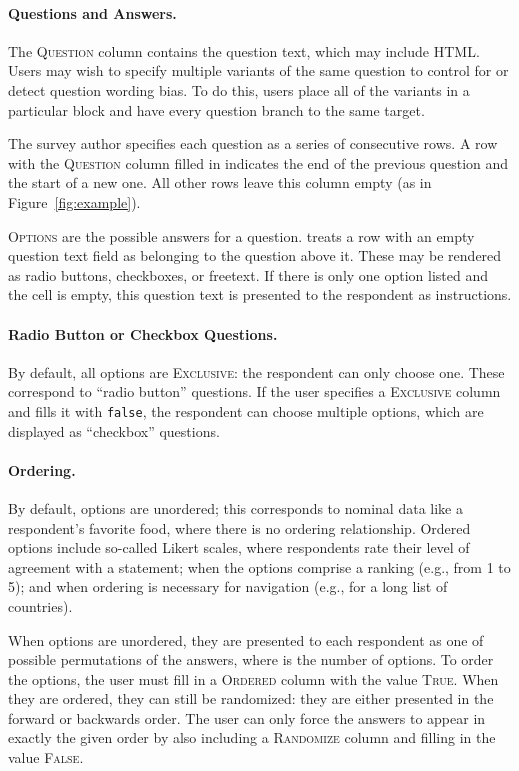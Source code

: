 \paragraph{Questions and Answers.}
The \textsc{Question} column contains the question text, which may
include HTML. Users may wish to specify multiple variants of the same question
to control for or detect question wording bias. To do this, users place
all of the variants in a particular block and have every question branch
to the same target.

The survey author specifies each question as a series of consecutive
rows. A row with the \textsc{Question} column filled in indicates the
end of the previous question and the start of a new one. All other
rows leave this column empty (as in Figure~\ref{fig:example}).

\textsc{Options} are the possible answers for a question. \surveyman{}
treats a row with an empty question text field as belonging to the
question above it. These may be rendered as radio buttons, checkboxes,
or freetext. If there is only one option listed and the cell is empty,
this question text is presented to the respondent as instructions.

\paragraph{Radio Button or Checkbox Questions.}
By default, all options are \textsc{Exclusive}: the respondent can
only choose one. These correspond to ``radio button'' questions. If
the user specifies a \textsc{Exclusive} column and fills it with
\texttt{false}, the respondent can choose multiple options, which are
displayed as ``checkbox'' questions.

\paragraph{Ordering.}
By default, options are unordered; this corresponds to nominal
data like a respondent's favorite food, where there is no ordering
relationship. Ordered options include so-called Likert scales, where
respondents rate their level of agreement with a statement; when the
options comprise a ranking (e.g., from 1 to 5); and when ordering is
necessary for navigation (e.g., for a long list of countries).

When options are unordered, they are presented to each respondent as one
of  possible permutations of the answers, where  is the
number of options. To order the options, the user must fill in a
\textsc{Ordered} column with the value \textsc{True}. When they are
ordered, they can still be randomized: they are either
presented in the forward or backwards order. The user can only force the
answers to appear in exactly the given order by also including a
\textsc{Randomize} column and filling in the value \textsc{False}.

